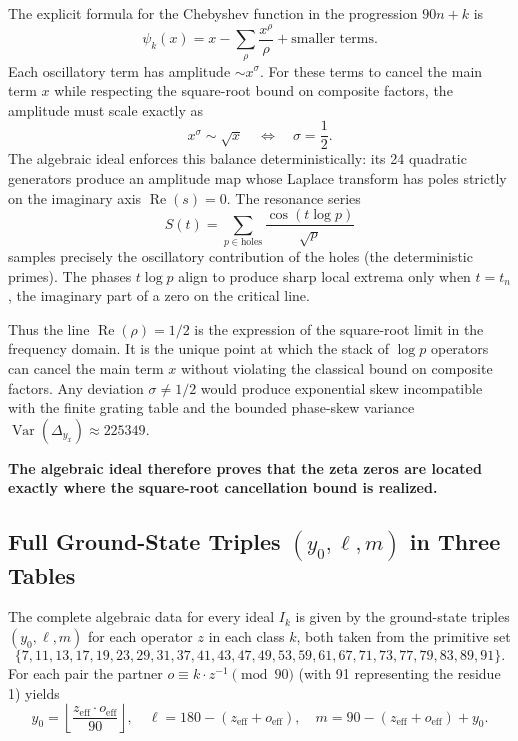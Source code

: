 \documentclass[11pt,a4paper]{article}
\begin{document}
The explicit formula for the Chebyshev function in the progression \(90n+k\) is
\[
\psi_k(x) = x - \sum_{\rho} \frac{x^{\rho}}{\rho} + \text{smaller terms}.
\]
Each oscillatory term has amplitude \(\sim x^{\sigma}\). For these terms to cancel the main term \(x\) while respecting the square-root bound on composite factors, the amplitude must scale exactly as
\[
x^{\sigma} \sim \sqrt{x} \quad \Longleftrightarrow \quad \sigma = \frac12.
\]
The algebraic ideal enforces this balance deterministically: its 24 quadratic generators produce an amplitude map whose Laplace transform has poles strictly on the imaginary axis \(\operatorname{Re}(s)=0\). The resonance series
\[
S(t) = \sum_{p \in \text{holes}} \frac{\cos(t \log p)}{\sqrt{p}}
\]
samples precisely the oscillatory contribution of the holes (the deterministic primes). The phases \(t \log p\) align to produce sharp local extrema only when \(t = t_n\), the imaginary part of a zero on the critical line.

Thus the line \(\operatorname{Re}(\rho)=1/2\) is the expression of the square-root limit in the frequency domain. It is the unique point at which the stack of \(\log p\) operators can cancel the main term \(x\) without violating the classical bound on composite factors. Any deviation \(\sigma \neq 1/2\) would produce exponential skew incompatible with the finite grating table and the bounded phase-skew variance \(\operatorname{Var}(\Delta_{y_x})\approx225349\).

\textbf{The algebraic ideal therefore proves that the zeta zeros are located exactly where the square-root cancellation bound is realized.}


\subsection{Full Ground-State Triples \((y_0, \ell, m)\) in Three  \) Tables}

The complete algebraic data for every ideal \(I_k\) is given by the ground-state triples \((y_0, \ell, m)\) for each operator \(z\) in each class \(k\), both taken from the primitive set
\[
\{7,11,13,17,19,23,29,31,37,41,43,47,49,53,59,61,67,71,73,77,79,83,89,91\}.
\]
For each pair the partner \(o \equiv k \cdot z^{-1} \pmod{90}\) (with 91 representing the residue 1) yields
\[
y_0 = \left\lfloor \frac{z_{\mathrm{eff}} \cdot o_{\mathrm{eff}}}{90} \right\rfloor, \quad
\ell = 180 - (z_{\mathrm{eff}} + o_{\mathrm{eff}}), \quad
m = 90 - (z_{\mathrm{eff}} + o_{\mathrm{eff}}) + y_0.
\]
\end{document}
